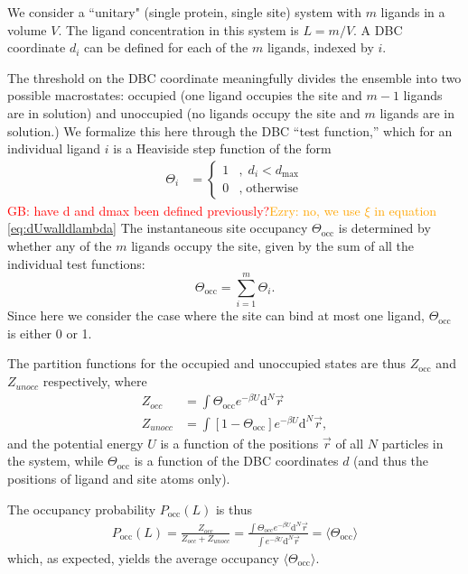 \documentclass[9pt,tutorial]{Styling/livecoms}
\newcommand{\grace}[1]{\textcolor{red}{GB: #1}}
\newcommand{\ezry}[1]{\textcolor{orange}{Ezry: #1}}
\begin{document}
We consider a ``unitary" (single protein, single site\cite{Salari2018}) system with $m$ ligands in a volume $V$. The ligand concentration in this system is $L=m/V$. A DBC coordinate $d_i$ can be defined for each of the $m$ ligands, indexed by $i$.  

The threshold on the DBC coordinate meaningfully divides the ensemble into two possible macrostates: occupied (one ligand occupies the site and $m-1$ ligands are in solution) and unoccupied (no ligands occupy the site and $m$ ligands are in solution.)  We formalize this here through the DBC ``test function,'' which for an individual ligand $i$ is a Heaviside step function  of the form 
\begin{align} 
   \Theta_i &= \begin{cases}
        1 &, \; d_{i} < d_\mathrm{max}\\
        0 &, \; \text{otherwise}
    \end{cases}
\end{align}
\grace{have d and dmax been defined previously?}\ezry{no, we use $\xi$ in equation \ref{eq:dUwalldlambda}} The instantaneous site occupancy $\Theta_\mathrm{occ}$ is determined by whether any of the $m$ ligands occupy the site, given by the sum of all the individual test functions:
\begin{equation}
   \Theta_\mathrm{occ}=\sum_{i=1}^m\Theta_i. 
\end{equation}
Since here we consider the case where the site can bind at most one ligand, $\Theta_\mathrm{occ}$ is either 0 or 1.  

The  partition functions for the occupied and unoccupied states are thus $Z_\mathrm{occ}$ and $Z_{unocc}$ respectively, where 
\begin{align}
    Z_{occ} &=\int \Theta_\mathrm{occ}e^{-\beta U} \mathrm{d}^N\vec{r}\\ 
    Z_{unocc} &= \int \left[1-\Theta_\mathrm{occ}\right]e^{-\beta U} \mathrm{d}^N\vec{r} , 
\end{align}
and the potential energy $U$ is a function of the positions $\vec{r}$ of all $N$ particles in the system, while $\Theta_\mathrm{occ}$ is a function of the DBC coordinates $d$ (and thus the positions of ligand and site atoms only).  

The occupancy probability $P_\mathrm{occ}(L)$ is thus  
\begin{align}\label{eq:probability1.5}
    P_\mathrm{occ}(L)=\frac{Z_{occ}} {Z_{occ} + Z_{unocc}}=\frac{\int \Theta_\mathrm{occ} e^{-\beta U} \mathrm{d}^N\vec{r}} {\int e^{-\beta U}\mathrm{d}^N\vec{r}}=\langle \Theta_\mathrm{occ}\rangle
\end{align} 
which, as expected, yields the average occupancy $\langle \Theta_\mathrm{occ}\rangle$.  
\end{document}
